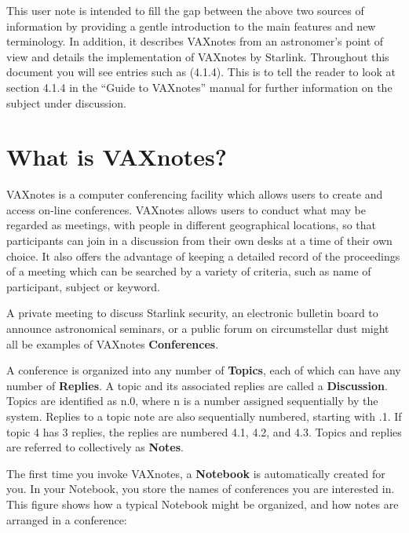 This user note is intended to fill the gap between the above two sources
of information by providing a gentle introduction to the main features and
new terminology.
In addition, it describes VAXnotes from an astronomer's
point of view and details the implementation of VAXnotes by Starlink.
Throughout this document you will see entries such as (4.1.4). 
This is to tell the reader to look at section 4.1.4 in the ``Guide to
VAXnotes'' manual for further information on the subject under discussion.

\section{What is VAXnotes?}

VAXnotes is a computer conferencing facility which allows users to create and
access on-line conferences. VAXnotes allows users to conduct
what may be regarded as meetings, with people in different geographical locations, so that participants
can join in a discussion from their own desks at a time of their own choice. It
also offers the advantage of keeping a detailed record of the proceedings of a
meeting which can be searched by a variety of criteria, such as name of
participant, subject or keyword. 

A private meeting to discuss Starlink security, an electronic
bulletin board to announce astronomical seminars, or a public forum on
circumstellar dust might all be examples of VAXnotes {\bf Conferences}. 

A conference is organized into any number of {\bf Topics}, each of which can
have any number of {\bf Replies}.  A topic and its associated replies are
called a {\bf Discussion}.  Topics are identified as n.0, where n is a
number assigned sequentially by the system.  Replies to a topic note
are also sequentially numbered, starting with .1.  If topic 4 has 3
replies, the replies are numbered 4.1, 4.2, and 4.3.  Topics and
replies are referred to collectively as {\bf Notes}.

The first time you invoke VAXnotes, a {\bf Notebook} is automatically
created for you.  In your Notebook, you store the names of conferences
you are interested in.  This figure shows how a typical Notebook might
be organized, and how notes are arranged in a conference:

